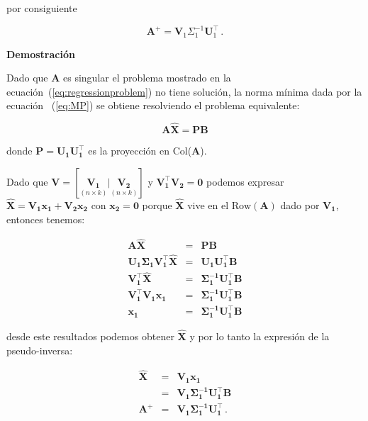 \noindent por consiguiente

\begin{equation}
\label{eq:pseudoinversesvd}
\mathbf{A}^{\!\!+} = \mathbf{V}_1 \Sigma_1^{-1} \mathbf{U}_1^\top \, .
\end{equation}


\textbf{Demostración}\quad

Dado que $\mathbf{A}$ es singular el problema mostrado en la ecuación~(\ref{eq:regressionproblem}) 
no tiene solución, la norma mínima dada por la ecuación ~(\ref{eq:MP}) se obtiene resolviendo
el problema equivalente:

\begin{equation*}
\label{eq:proyectorsol}
\mathbf{A \hat{X} = PB} 
\end{equation*}

\noindent donde $\mathbf{P=U_1 U_1^\top}$ es la proyección en Col($\mathbf{A}$).

Dado que $\mathbf{V} = [\underset{(n \times k)}{\mathbf{V_1}} |
\underset{(n \times k)}{\mathbf{V_2}}]$ y $\mathbf{V_1^\top V_2 =
0}$ podemos expresar $\mathbf{\hat{X}} = \mathbf{V_1 x_1 + V_2 x_2}$
con $\mathbf{x_2=0}$ porque $\mathbf{\hat{X}}$ vive en el
$\text{Row}(\mathbf{A})$ dado por $\mathbf{V_1}$, entonces tenemos:

\begin{eqnarray*}
\mathbf{A \hat{X}} &=& \mathbf{PB} \\
\mathbf{U_1 \Sigma_1 V_1^\top \hat{X}} &=& \mathbf{U_1 U_1^\top B} \\
\mathbf{ V_1^\top \hat{X}} &=&  \mathbf{\Sigma_1^{-1} U_1^\top B} \\ 
\mathbf{ V_1^\top V_1 x_1} &=& \mathbf{\Sigma_1^{-1}
U_1^\top B} \\
\mathbf{x_1}&=& \mathbf{\Sigma_1^{-1} U_1^\top B}
\end{eqnarray*}

\noindent desde este resultados podemos obtener $\mathbf{\hat{X}}$ y
por lo tanto la expresión de la pseudo-inversa:

\begin{eqnarray*}
\mathbf{\hat{X}} &=& \mathbf{V_1 x_1} \\
                &=& \mathbf{V_1 \Sigma_1^{-1} U_1^\top B} \\
\mathbf{A^+} &=& \mathbf{V_1 \Sigma_1^{-1} U_1^\top} \, .
\end{eqnarray*}


